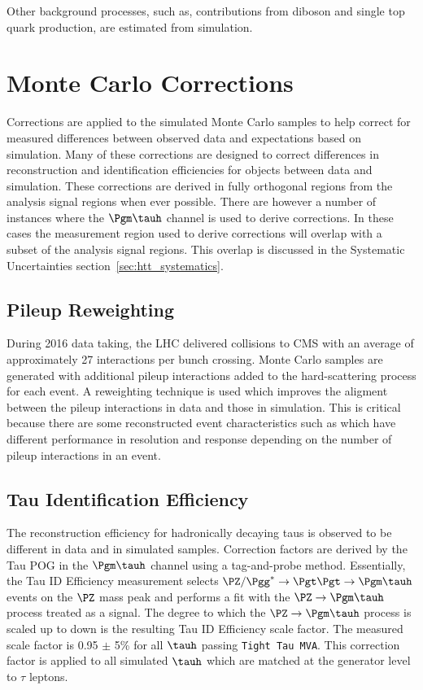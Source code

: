 Other background processes, such as, contributions from diboson and single top quark production, are estimated 
from simulation.


\section{Monte Carlo Corrections}
\label{sec:mc_corrections}

Corrections are applied to the simulated Monte Carlo samples to help correct for measured differences
between observed data and expectations based on simulation. Many of these corrections are designed
to correct differences in reconstruction and identification efficiencies for objects between data
and simulation. These corrections are derived in
fully orthogonal regions from the analysis signal regions when ever possible. There are however a
number of
instances where the $\Pgm\tauh$ channel is used to derive corrections. In these cases the measurement
region used to derive corrections will overlap with a subset of the analysis signal regions. This
overlap is discussed in the Systematic Uncertainties section~\ref{sec:htt_systematics}.


\subsection{Pileup Reweighting}
During 2016 data taking, the LHC delivered \pp collisions to CMS with an average of approximately 27
interactions per bunch crossing. Monte Carlo samples are generated with additional pileup interactions
added to the hard-scattering process for each event. A reweighting technique is used which improves
the aligment between the pileup interactions in data and those in simulation. This is critical because
there are some reconstructed event characteristics such as \etvecmiss which have different performance
in resolution and response depending on the number of pileup interactions in an event.


\subsection{Tau Identification Efficiency}
\label{sec:htt_tau_id_eff}
The reconstruction efficiency for hadronically decaying taus is observed to be different in data and in simulated samples.
Correction factors are derived by the Tau POG in the $\Pgm\tauh$ channel using a tag-and-probe method. Essentially,
the Tau ID Efficiency measurement selects $\PZ/\Pgg^*\to\Pgt\Pgt\to\Pgm\tauh$ events on the $\PZ$
mass peak and performs a fit with the $\PZ\to\Pgm\tauh$ process treated as a signal. The degree
to which the $\PZ\to\Pgm\tauh$ process is scaled up to down is the resulting Tau ID Efficiency
scale factor. The measured scale factor is 0.95 $\pm$ 5\% for all $\tauh$ passing \texttt{Tight Tau MVA}.
This correction factor is applied to all simulated $\tauh$ which are matched at the generator
level to $\tau$ leptons.


